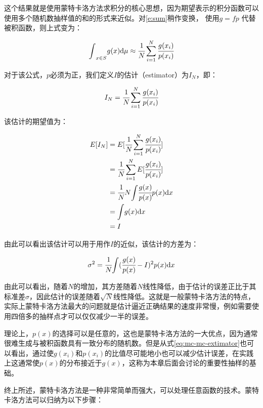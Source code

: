 \noindent 这个结果就是使用蒙特卡洛方法求积分的核心思想，因为期望表示的积分函数可以使用多个随机数抽样值的和的形式来近似。对\ref{e:sum}稍作变换， 使用$g=fp$ 代替被积函数，则上式变为：

\begin{equation}
	{\rm \int}_{x\in S}g(x){\rm d}\mu\approx \cfrac{1}{N}\sum_{i=1}^{N} \cfrac{g(x_i)}{p(x_i)}
\end{equation}

\noindent 对于该公式，$p$必须为正，我们定义$I$的估计（estimator）为$I_N$，即：

\begin{equation}\label{eq:mc-mc-extimator}
	I_N= \cfrac{1}{N}\sum_{i=1}^{N} \cfrac{g(x_i)}{p(x_i)}
\end{equation}

\noindent 该估计的期望值为：

\begin{equation}
	\begin{aligned}
		E[I_N]&=E[ \cfrac{1}{N}\sum_{i=1}^{N} \cfrac{g(x_i)}{p(x_i)}]\\
		&= \cfrac{1}{N}\sum_{i=1}^{N}E[ \cfrac{g(x_i)}{p(x_i)}]\\
		&= \cfrac{1}{N}N{\rm \int}  \cfrac{g(x)}{p(x)}p(x){\rm d}x\\
		&={\rm \int} g(x){\rm d}x\\
		&=I
	\end{aligned}
\end{equation}

\noindent 由此可以看出该估计可以用于用作$I$的近似，该估计的方差为：

\begin{equation}\label{e:variance}
	\sigma^2= \cfrac{1}{N}{\rm \int}( \cfrac{g(x)}{p(x)}-I)^2p(x){\rm d}x
\end{equation}

\noindent 由此可以看出，随着$N$的增加，其方差随着$N$线性降低，由于估计的误差正比于其标准差$\sigma$，因此估计的误差随着$\sqrt{N}$线性降低。这就是一般蒙特卡洛方法的特点，实际上蒙特卡洛方法最大的问题就是估计逼近正确结果的速度非常慢，例如需要使用四倍多的抽样点才可以仅仅减少一半的误差。 

理论上，$p(x)$的选择可以是任意的，这也是蒙特卡洛方法的一大优点，因为通常很难生成与被积函数具有一致分布的随机数。但是从式\ref{eq:mc-mc-extimator}也可以看出，通过使$g(x_i)$和$p(x_i)$的比值尽可能地小也可以减少估计误差，在实践上这通常使$p(x)$的分布接近于$g(x)$，这称为本章后面会讨论的重要性抽样的基础。

终上所述，蒙特卡洛方法是一种非常简单而强大，可以处理任意函数的技术。蒙特卡洛方法可以归纳为以下步骤：

